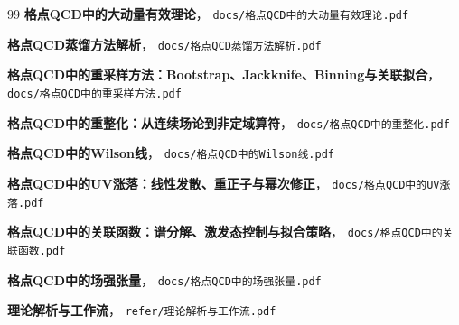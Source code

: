 \documentclass[12pt,a4paper]{ctexart}
\theoremstyle{definition}
\begin{document}
\begin{thebibliography}{99}
\textbf{格点QCD中的大动量有效理论}，
\texttt{docs/格点QCD中的大动量有效理论.pdf}

\textbf{格点QCD蒸馏方法解析}，
\texttt{docs/格点QCD蒸馏方法解析.pdf}

\textbf{格点QCD中的重采样方法：Bootstrap、Jackknife、Binning与关联拟合}，
\texttt{docs/格点QCD中的重采样方法.pdf}

\textbf{格点QCD中的重整化：从连续场论到非定域算符}，
\texttt{docs/格点QCD中的重整化.pdf}

\textbf{格点QCD中的Wilson线}，
\texttt{docs/格点QCD中的Wilson线.pdf}

\textbf{格点QCD中的UV涨落：线性发散、重正子与幂次修正}，
\texttt{docs/格点QCD中的UV涨落.pdf}

\textbf{格点QCD中的关联函数：谱分解、激发态控制与拟合策略}，
\texttt{docs/格点QCD中的关联函数.pdf}

\textbf{格点QCD中的场强张量}，
\texttt{docs/格点QCD中的场强张量.pdf}

\textbf{理论解析与工作流}，
\texttt{refer/理论解析与工作流.pdf}

\end{thebibliography}
\end{document}
